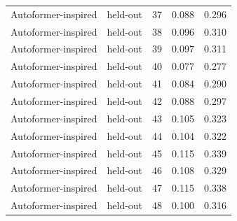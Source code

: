 \begin{tabular}{llrrr}
Autoformer-inspired & held-out & 37 & 0.088 & 0.296 \\
Autoformer-inspired & held-out & 38 & 0.096 & 0.310 \\
Autoformer-inspired & held-out & 39 & 0.097 & 0.311 \\
Autoformer-inspired & held-out & 40 & 0.077 & 0.277 \\
Autoformer-inspired & held-out & 41 & 0.084 & 0.290 \\
Autoformer-inspired & held-out & 42 & 0.088 & 0.297 \\
Autoformer-inspired & held-out & 43 & 0.105 & 0.323 \\
Autoformer-inspired & held-out & 44 & 0.104 & 0.322 \\
Autoformer-inspired & held-out & 45 & 0.115 & 0.339 \\
Autoformer-inspired & held-out & 46 & 0.108 & 0.329 \\
Autoformer-inspired & held-out & 47 & 0.115 & 0.338 \\
Autoformer-inspired & held-out & 48 & 0.100 & 0.316 \\
\bottomrule
\end{tabular}
